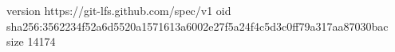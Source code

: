 version https://git-lfs.github.com/spec/v1
oid sha256:3562234f52a6d5520a1571613a6002e27f5a24f4c5d3c0ff79a317aa87030bac
size 14174
